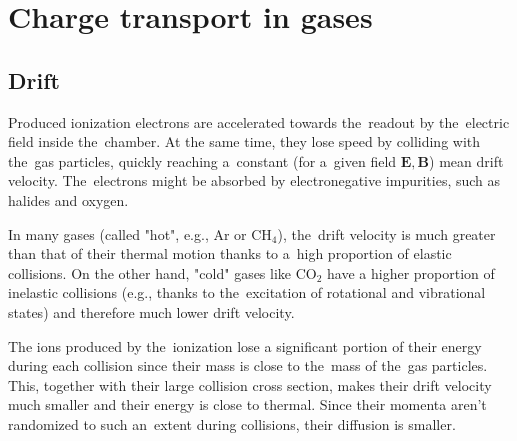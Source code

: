 	
	\section{Charge transport in gases}
		\subsection{Drift}
			Produced ionization electrons are accelerated towards the~readout by the~electric field inside the~chamber. At the same time, they lose speed by colliding with the~gas particles, quickly reaching a~constant (for a~given field $\mathbf{E}, \mathbf{B}$) mean drift velocity. The~electrons might be absorbed by electronegative impurities, such as halides and oxygen.
			
			In many gases (called "hot", e.g., Ar or CH$_4$), the~drift velocity is much greater than that of their thermal motion thanks to a~high proportion of elastic collisions. On the other hand, "cold" gases like CO$_2$ have a higher proportion of inelastic collisions (e.g., thanks to the~excitation of rotational and vibrational states) and therefore much lower drift velocity.
			
			The ions produced by the~ionization lose a significant portion of their energy during each collision since their mass is close to the~mass of the~gas particles. This, together with their large collision cross section, makes their drift velocity much smaller and their energy is close to thermal. Since their momenta aren't randomized to such an~extent during collisions, their diffusion is smaller.
			
